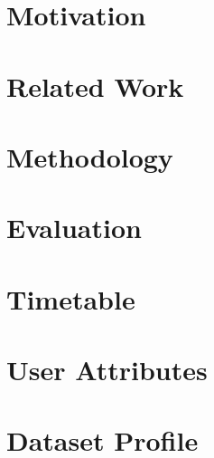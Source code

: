 \documentclass[10pt,twocolumn]{IEEEtran11}
\begin{document}
\section{Motivation}  


\section{Related Work}  


\section{Methodology}


\section{Evaluation}


\section{Timetable}


\onecolumn
\section{User Attributes}


\section{Dataset Profile}


\twocolumn

\end{document}

